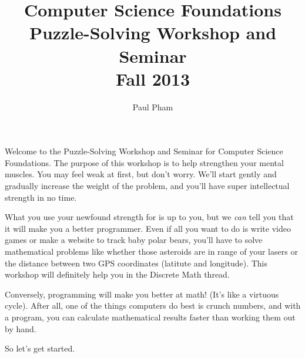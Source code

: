 \documentclass{article}
\title{Computer Science Foundations\\ Puzzle-Solving Workshop and Seminar\\
Fall 2013}
\author{Paul Pham}
\begin{document}
\maketitle

Welcome to the Puzzle-Solving Workshop and Seminar for
Computer Science Foundations. The purpose of this workshop
is to help strengthen your mental muscles. You may feel weak at
first, but don't worry. We'll start gently and gradually increase
the weight of the problem, and you'll have super intellectual
strength in no time.

What you use your newfound strength for is up to you, but we
\emph{can} tell you that it will make you a better programmer. Even if
all you want to do is write video games or make a website to track
baby polar bears, you'll have to solve mathematical problems
like whether those asteroids are in range of your lasers or the
distance between two GPS coordinates (latitute and longitude).
This workshop will definitely help you in the Discrete Math thread.

Conversely,
programming will make you better at math! (It's like a virtuous
cycle). After all,
one of the things computers do best is crunch numbers, and with
a program, you can calculate mathematical results faster than
working them out by hand.

So let's get started.





\end{document}
